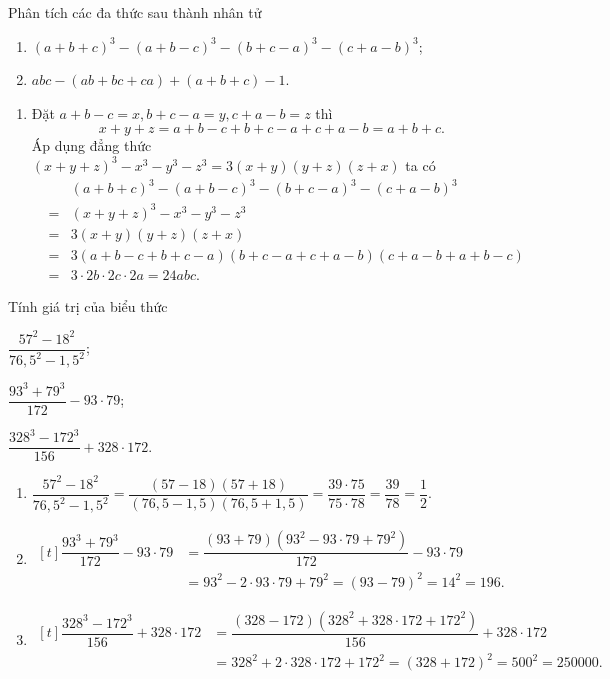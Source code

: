 \begin{vn}
	Phân tích các đa thức sau thành nhân tử
	\begin{enumerate}
		\item $(a+b+c)^3 - (a+b-c)^3 - (b+c-a)^3 - (c+a-b)^3$;
		\item $abc - (ab+bc+ca) + (a+b+c) - 1$.
	\end{enumerate}
	\loigiai 
	{
		\begin{enumerate}
			\item Đặt $a+b-c=x, b+c-a=y, c+a-b=z$ thì
				\[x+y+z = a+b-c + b+c-a + c+a-b = a+b+c.\]
				Áp dụng đẳng thức $(x+y+z)^3 - x^3 - y^3 - z^3 = 3(x+y)(y+z)(z+x)$  ta có
				{\allowdisplaybreaks
				\begin{eqnarray*}
					&& (a+b+c)^3 - (a+b-c)^3 - (b+c-a)^3 - (c+a-b)^3 \\
					&=& (x+y+z)^3 - x^3 - y^3 - z^3 \\
					&=& 3(x+y)(y+z)(z+x) \\
					&=& 3(a+b-c+b+c-a)(b+c-a + c+a-b)(c+a-b + a+b-c) \\
					&=& 3 \cdot 2b \cdot 2c \cdot 2a = 24abc.
				\end{eqnarray*}
				}
		\end{enumerate}
	}
\end{vn}

\begin{vn}
	Tính giá trị của biểu thức
	\begin{listEX}[3]
		\item $\dfrac{57^2 - 18^2}{76,5^2 - 1,5^2}$;
		\item $\dfrac{93^3 + 79^3}{172} - 93 \cdot 79$;
		\item $\dfrac{328^3 - 172^3}{156} + 328 \cdot 172$.
	\end{listEX}
	\loigiai 
	{
		\begin{enumerate}
			\item $\dfrac{57^2 - 18^2}{76,5^2 - 1,5^2} = \dfrac{(57-18)(57+18)}{(76,5 - 1,5)(76,5 + 1,5)} = \dfrac{39 \cdot 75}{75 \cdot 78} = \dfrac{39}{78} = \dfrac{1}{2}.$
			\item 
			{\allowdisplaybreaks
				$\begin{aligned}[t]
					\dfrac{93^3 + 79^3}{172} - 93 \cdot 79 &= \dfrac{(93 + 79)\left(93^2 - 93 \cdot 79 + 79^2\right)}{172} - 93 \cdot 79 \\
					&= 93^2 -2 \cdot 93 \cdot 79 + 79^2 = (93 - 79)^2 = 14^2 = 196.
				\end{aligned}$
			}
			\item 
			{\allowdisplaybreaks
				$\begin{aligned}[t]
					\dfrac{328^3 - 172^3}{156} + 328 \cdot 172 &= \dfrac{(328 - 172) \left(328^2 + 328 \cdot 172 + 172^2\right)}{156} + 328 \cdot 172 \\
					&= 328^2 + 2 \cdot 328 \cdot 172 + 172^2 = (328 + 172)^2 = 500^2 = 250000.
				\end{aligned}$
			}
		\end{enumerate}
	}
\end{vn}

